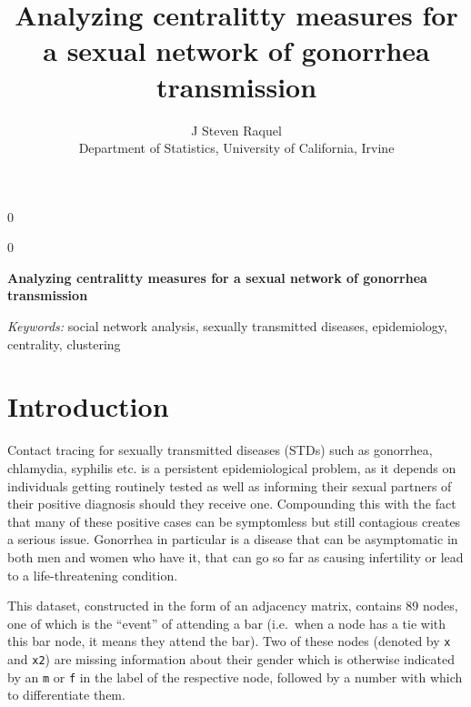 \documentclass[12pt]{article}
\newcommand{\blind}{0}
\begin{document}
\def\spacingset#1{\renewcommand{\baselinestretch}%
{#1}\small\normalsize} \spacingset{1}



\blind
{
  \title{\bf Analyzing centralitty measures for a sexual network of gonorrhea transmission}

  \author{
        J Steven Raquel \\
    Department of Statistics, University of California, Irvine\\
      }
  \maketitle
} \fi

\blind
{
  \bigskip
  \bigskip
  \bigskip
  \begin{center}
    {\LARGE\bf Analyzing centralitty measures for a sexual network of gonorrhea transmission}
  \end{center}
  \medskip
} \fi

\bigskip
\begin{abstract}

\end{abstract}

\noindent%
{\it Keywords:} social network analysis, sexually transmitted diseases, epidemiology, centrality, clustering
\vfill

\newpage
\spacingset{1.45} %

\hypertarget{introduction}{%
\section{Introduction}\label{introduction}}

Contact tracing for sexually transmitted diseases (STDs) such as gonorrhea, chlamydia, syphilis etc. is a persistent epidemiological problem, as it depends on individuals getting routinely tested as well as informing their sexual partners of their positive diagnosis should they receive one. Compounding this with the fact that many of these positive cases can be symptomless but still contagious creates a serious issue. Gonorrhea in particular is a disease that can be asymptomatic in both men and women who have it, that can go so far as causing infertility or lead to a life-threatening condition.

This dataset, constructed in the form of an adjacency matrix, contains 89 nodes, one of which is the ``event'' of attending a bar (i.e.~when a node has a tie with this bar node, it means they attend the bar). Two of these nodes (denoted by \texttt{x} and \texttt{x2}) are missing information about their gender which is otherwise indicated by an \texttt{m} or \texttt{f} in the label of the respective node, followed by a number with which to differentiate them.
\end{document}
